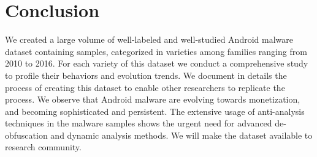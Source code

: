 \vspace{-.1in}
\section{Conclusion}
\label{sec:conclusion}
\vspace{-.02in}

We created a large volume of well-labeled and well-studied
Android malware dataset containing \samsize samples, categorized in \versize
varieties among \fsize families ranging from 2010 to 2016.
For each variety of this dataset we 
conduct a comprehensive study to profile their behaviors and evolution trends.
We document in details the process of creating this dataset to enable other
researchers to replicate the process.
We observe that Android malware are evolving towards monetization, and becoming
sophisticated and persistent.
The extensive usage of anti-analysis techniques in the malware samples
shows the urgent need for advanced de-obfuscation and dynamic analysis methods.
We will make the dataset available to research community.

